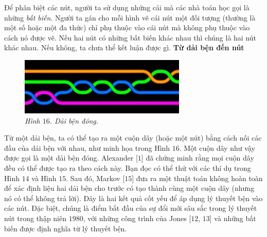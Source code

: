 \begin{multicols}{2}
	\vskip 0.05cm
	Để phân biệt các nút, người ta sử dụng những cái mà các nhà toán học gọi là những \textit{bất biến}. Người ta gán cho mỗi hình vẽ cái nút một đối tượng (thường là một số hoặc một đa thức) chỉ phụ thuộc vào cái nút mà không phụ thuộc vào cách nó được vẽ. Nếu hai nút có những bất biến khác nhau thì chúng là hai nút khác nhau. Nếu không, ta chưa thể kết luận được gì.
	\vskip 0.1cm
	\textbf{\color{duongvaotoanhoc}Từ dải bện đến nút}
	\begin{figure}[H]
		\vspace*{-10pt}
		\centering
		\captionsetup{labelformat= empty, justification=centering}
		\includegraphics[width= 1\linewidth]{fig_16}
		\caption{\small\textit{\color{duongvaotoanhoc}Hình $16$. Dải bện đóng.}}
		\vspace*{-10pt}
	\end{figure}
	Từ một dải bện, ta có thể tạo ra một cuộn dây (hoặc một nút) bằng cách nối các đầu của dải bện với nhau, như minh họa trong Hình $16$. Một cuộn dây như vậy được gọi là một dải bện đóng. Alexander [$1$] đã chứng minh rằng mọi cuộn dây đều có thể được tạo ra theo cách này. Bạn đọc có thể thử với các thí dụ trong Hình $14$ và Hình $15$. Sau đó, Markov [$15$] đưa ra một thuật toán không hoàn toàn để xác định liệu hai dải bện cho trước có tạo thành cùng một cuộn dây (nhưng nó có thể không trả lời). Đây là hai kết quả cốt yếu để áp dụng lý thuyết bện vào các nút. Đặc biệt, chúng là điểm bắt đầu của sự đổi mới sâu sắc trong lý thuyết nút trong thập niên $1980$, với những công trình của Jones [$12$, $13$] và những bất biến được định nghĩa từ lý thuyết bện.
		\begin{tBox}
				\begin{figure}
						\vspace*{-15pt}
						\centering
						\captionsetup{labelformat= empty, justification=centering}

\end{figure}
\end{tBox}
\end{multicols}

